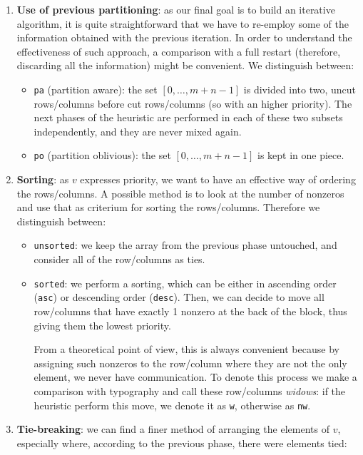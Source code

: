 \begin{enumerate}
 \item \textbf{Use of previous partitioning}: as our final goal is to build an iterative algorithm, it is quite straightforward that we have to re-employ some of the information obtained with the previous iteration. In order to understand the effectiveness of such approach, a comparison with a full restart (therefore, discarding all the information) might be convenient. We distinguish between:
 
  \begin{itemize}
 \item \verb|pa| (partition aware): the set $[0,\dots,m+n-1]$ is divided into two, uncut rows/columns before cut rows/columns (so with an higher priority). The next phases of the heuristic are performed in each of these two subsets independently, and they are never mixed again.
 \item \verb|po| (partition oblivious): the set $[0,\dots,m+n-1]$ is kept in one piece.
 \end{itemize}

 \item \textbf{Sorting}: as $v$ expresses priority, we want to have an effective way of ordering the rows/columns. A possible method is to look at the number of nonzeros and use that as criterium for sorting the rows/columns. Therefore we distinguish between:
 
 \begin{itemize}
  \item \verb|unsorted|: we keep the array from the previous phase untouched, and consider all of the row/columns as ties.
  \item \verb|sorted|: we perform a sorting, which can be either in ascending order (\verb|asc|) or descending order (\verb|desc|). Then, we can decide to move all row/columns that have exactly 1 nonzero at the back of the block, thus giving them the lowest priority.
  
  From a theoretical point of view, this is always convenient because by assigning such nonzeros to the row/column where they are not the only element, we never have communication. To denote this process we make a comparison with typography and call these row/columns \emph{widows}: if the heuristic perform this move, we denote it as \verb|w|, otherwise as \verb|nw|.
 \end{itemize}

 \item \textbf{Tie-breaking}: we can find a finer method of arranging the elements of $v$, especially where, according to the previous phase, there were elements tied:
 

\end{enumerate}
